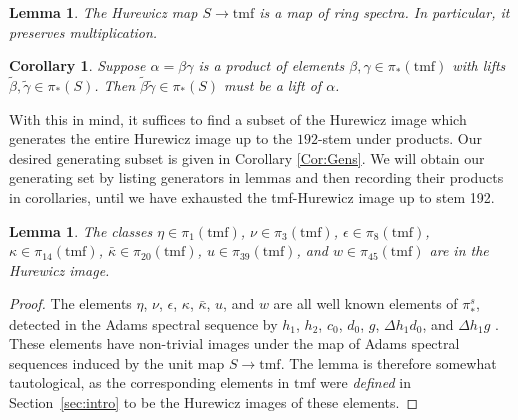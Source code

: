 \documentclass[10pt]{amsart}
\newcommand{\bra}[1]{\langle #1 \rangle}
\newcommand{\td}[1]{\widetilde{#1}}
\newcommand{\tmf}{\mathrm{tmf}}
\newtheorem{cor}[equation]{Corollary}
\newtheorem{lem}[equation]{Lemma}
\theoremstyle{definition}
\numberwithin{equation}{section}
\numberwithin{figure}{section}
\begin{document}
\begin{lem}\label{Lem:Eoo}
The Hurewicz map $S \to \tmf$ is a map of ring spectra. In particular, it preserves multiplication. 
\end{lem}


\begin{cor}
Suppose $\alpha = \beta \gamma$ is a product of elements $\beta, \gamma \in \pi_*(\tmf)$ with lifts $\tilde{\beta}, \tilde{\gamma} \in \pi_*(S)$. Then $\tilde{\beta} \tilde{\gamma} \in \pi_*(S)$ must be a lift of $\alpha$.
\end{cor}
 

With this in mind, it suffices to find a subset of the Hurewicz image which generates the entire Hurewicz image up to the $192$-stem under products. Our desired generating subset is given in Corollary \ref{Cor:Gens}.  We will obtain our generating set by listing generators in lemmas and then recording their products in corollaries, until we have exhausted the tmf-Hurewicz image up to stem 192. 

\begin{lem}
The classes $\eta \in \pi_1(\tmf)$, $\nu \in \pi_3(\tmf)$,
$\epsilon \in \pi_8(\tmf)$, $\kappa \in \pi_{14}(\tmf)$, $\bar{\kappa} \in \pi_{20}(\tmf)$, $u \in \pi_{39}(\tmf)$, and $w \in \pi_{45}(\tmf)$
are in the Hurewicz image.
\end{lem}

\begin{proof}
The elements $\eta$, $\nu$, $\epsilon$, $\kappa$, $\bar{\kappa}$, $u$, and $w$ are all well known elements of $\pi_*^s$, detected in the Adams spectral sequence by $h_1$, $h_2$, $c_0$, $d_0$, $g$, $\Delta h_1 d_0$, and $\Delta h_1 g$
\cite[Table 8]{Isaksen}.  These elements have non-trivial images under the map of Adams spectral sequences induced by the unit map $S \to \tmf$.  The lemma is therefore somewhat tautological, as the corresponding elements in $\tmf$ were \emph{defined} in Section~\ref{sec:intro} to be the Hurewicz images of these elements. 
\end{proof}
\end{document}
